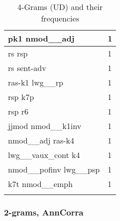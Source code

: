 \documentclass[a4 paper]{article}
\begin{document}
\begin{longtable}{p{}p{}}
pk1 nmod\_\_adj  & 1 \\ \midrule
rs rsp  & 1 \\ \midrule
rs sent-adv  & 1 \\ \midrule
ras-k1 lwg\_\_rp  & 1 \\ \midrule
rsp k7p  & 1 \\ \midrule
rsp r6  & 1 \\ \midrule
jjmod nmod\_\_k1inv  & 1 \\ \midrule
nmod\_\_adj ras-k4  & 1 \\ \midrule
lwg\_\_vaux\_cont k4  & 1 \\ \midrule
nmod\_\_pofinv lwg\_\_psp  & 1 \\ \midrule
k7t nmod\_\_emph  & 1 \\ \midrule
    \caption{4-Grams (UD) and their frequencies}
\label{tab:ngram4ud}
\end{longtable}
    

\subsubsection{2-grams, AnnCorra}
\end{document}
